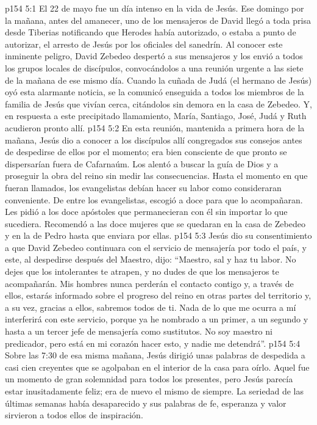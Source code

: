 \vs p154 5:1 El 22 de mayo fue un día intenso en la vida de Jesús. Ese domingo por la mañana, antes del amanecer, uno de los mensajeros de David llegó a toda prisa desde Tiberias notificando que Herodes había autorizado, o estaba a punto de autorizar, el arresto de Jesús por los oficiales del sanedrín. Al conocer este inminente peligro, David Zebedeo despertó a sus mensajeros y los envió a todos los grupos locales de discípulos, convocándolos a una reunión urgente a las siete de la mañana de ese mismo día. Cuando la cuñada de Judá (el hermano de Jesús) oyó esta alarmante noticia, se la comunicó enseguida a todos los miembros de la familia de Jesús que vivían cerca, citándolos sin demora en la casa de Zebedeo. Y, en respuesta a este precipitado llamamiento, María, Santiago, José, Judá y Ruth acudieron pronto allí.
\vs p154 5:2 En esta reunión, mantenida a primera hora de la mañana, Jesús dio a conocer a los discípulos allí congregados sus consejos antes de despedirse de ellos por el momento; era bien consciente de que pronto se dispersarían fuera de Cafarnaúm. Los alentó a buscar la guía de Dios y a proseguir la obra del reino sin medir las consecuencias. Hasta el momento en que fueran llamados, los evangelistas debían hacer su labor como consideraran conveniente. De entre los evangelistas, escogió a doce para que lo acompañaran. Les pidió a los doce apóstoles que permanecieran con él sin importar lo que sucediera. Recomendó a las doce mujeres que se quedaran en la casa de Zebedeo y en la de Pedro hasta que enviara por ellas.
\vs p154 5:3 Jesús dio su consentimiento a que David Zebedeo continuara con el servicio de mensajería por todo el país, y este, al despedirse después del Maestro, dijo: “Maestro, sal y haz tu labor. No dejes que los intolerantes te atrapen, y no dudes de que los mensajeros te acompañarán. Mis hombres nunca perderán el contacto contigo y, a través de ellos, estarás informado sobre el progreso del reino en otras partes del territorio y, a su vez, gracias a ellos, sabremos todos de ti. Nada de lo que me ocurra a mí interferirá con este servicio, porque ya he nombrado a un primer, a un segundo y hasta a un tercer jefe de mensajería como sustitutos. No soy maestro ni predicador, pero está en mi corazón hacer esto, y nadie me detendrá”.
\vs p154 5:4 Sobre las 7:30 de esa misma mañana, Jesús dirigió unas palabras de despedida a casi cien creyentes que se agolpaban en el interior de la casa para oírlo. Aquel fue un momento de gran solemnidad para todos los presentes, pero Jesús parecía estar inusitadamente feliz; era de nuevo el mismo de siempre. La seriedad de las últimas semanas había desaparecido y sus palabras de fe, esperanza y valor sirvieron a todos ellos de inspiración.

